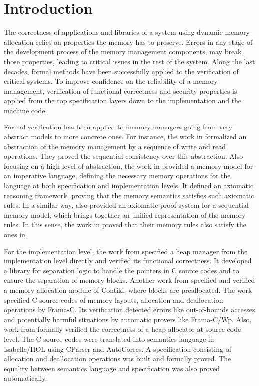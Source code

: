 \section{Introduction}
The correctness of applications and libraries of a system using dynamic memory allocation relies on properties the memory has to preserve. Errors in any stage of the development process of the memory management components, may break those properties, leading to critical issues in the rest of the system. Along the last decades, formal methods have been successfully applied to the verification of critical systems. To improve confidence on the reliability of a memory management, verification of functional correctness and security properties is applied from the top specification layers down to the implementation and the machine code.

Formal verification has been applied to memory managers going from very abstract models to more concrete ones. For instance, the work in\cite{reg_higham} formalized an abstraction of the memory management by a sequence of write and read operations. They proved the sequential consistency over this abstraction. Also focusing on a high level of abstraction, the work in\cite{reg_blazy} provided a memory model for an imperative language, defining the necessary memory operations for the language at both specification and implementation levels. It defined an axiomatic reasoning framework, proving that the memory semantics satisfies such axiomatic rules. In a similar way,\cite{reg_mansky} also provided an axiomatic proof system for a sequential memory model, which brings together an unified representation of the memory rules. In this sense, the work in\cite{reg_mansky} proved that their memory rules also satisfy the ones in\cite{reg_blazy}.

For the implementation level, the work from\cite{reg_marti} specified a heap manager from the implementation level directly and verified its functional correctness. It developed a library for separation logic to handle the pointers in C source codes and to ensure the separation of memory blocks. Another work from\cite{reg_mangano} specified and verified a memory allocation module of Contiki, where blocks are preallocated. The work specified C source codes of memory layouts, allocation and deallocation operations by Frama-C. Its verification detected errors like out-of-bounds accesses and potentially harmful situations by automatic provers like Frama-C/Wp. Also, work from\cite{reg_sahebolamri} formally verified the correctness of a heap allocator at source code level. The C source codes were translated into semantics language in Isabelle/HOL using CParser and AutoCorres. A specification consisting of allocation and deallocation operations was built and formally proved. The equality between semantics language and specification was also proved automatically.


